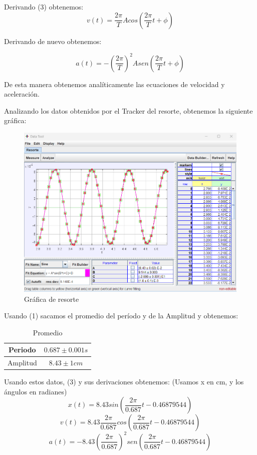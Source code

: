 \documentclass[a4paper]{article}
\begin{document}
Derivando (3) obtenemos:
\[v(t)=\frac{2\pi}{T}Acos(\frac{2\pi}{T} t + \phi)\]

Derivando de nuevo obtenemos:

\[a(t)=-(\frac{2\pi}{T})^2 Asen(\frac{2\pi}{T} t + \phi)\]

De esta manera obtenemos analíticamente las ecuaciones de velocidad y aceleración.

Analizando los datos obtenidos por el Tracker del resorte, obtenemos la siguiente gráfica: 

\begin{figure} [H] 
    \centering
    \includegraphics[scale=0.75]{Resorte.png}
    \caption{Gráfica de resorte}
    \label{Resorte}
\end{figure}
Usando (1) sacamos el promedio del período y de la Amplitud y obtenemos:
\begin{table}[H]
    \centering
    \begin{tabular}{|c|c|}
    \hline
        Periodo  & $0.687 \pm 0.001 s$ \\ \hline
        Amplitud & $8.43 \pm 1 cm $ \\ \hline        
    \end{tabular}
    \caption{Promedio}
    \label{Promedio}
\end{table}

Usando estos datos, (3) y sus derivaciones obtenemos:
(Usamos x en cm, y los ángulos en radianes)
\[x(t)=8.43sin(\frac{2\pi}{0.687} t -0.46879544)\]
\[v(t)=8.43\frac{2\pi}{0.687}cos(\frac{2\pi}{0.687} t -0.46879544)\]
\[a(t)=-8.43{(\frac{2\pi}{0.687})}^2sen(\frac{2\pi}{0.687} t -0.46879544)\]
\end{document}
